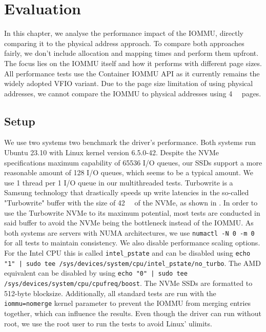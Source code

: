 \chapter{Evaluation}
In this chapter, we analyse the performance impact of the IOMMU, directly comparing it to the physical address approach. To compare both approaches fairly, we don't include allocation and mapping times and perform them upfront. The focus lies on the IOMMU itself and how it performs with different page sizes. All performance tests use the Container IOMMU API as it currently remains the widely adopted VFIO variant.
Due to the page size limitation of using physical addresses, we cannot compare the IOMMU to physical addresses using \qty{4}{\kibi\byte} pages.

\section{Setup}
We use two systems two benchmark the driver's performance.
Both systems run Ubuntu 23.10 with Linux kernel version 6.5.0-42.
Despite the NVMe specifications maximum capability of 65536 I/O queues, our SSDs support a more reasonable amount of 128 I/O queues, which seems to be a typical amount.
We use 1 thread per 1 I/O queue in our multithreaded tests. Turbowrite is a Samsung technology that drastically speeds up write latencies in the so-called "Turbowrite" buffer with the size of \qty{42}{\giga\byte} of the NVMe, as shown in \cite{vroom}. In order to use the Turbowrite NVMe to its maximum potential, most tests are conducted in said buffer to avoid the NVMe being the bottleneck instead of the IOMMU.
As both systems are servers with NUMA architectures, we use \texttt{numactl -N 0 -m 0} for all tests to maintain consistency. We also disable performance scaling options. For the Intel CPU this is called \texttt{intel\_pstate} and can be disabled using \texttt{echo "1" | sudo tee /sys/devices/system/cpu/intel\_pstate/no\_turbo}. The AMD equivalent can be disabled by using \texttt{echo "0" | sudo tee /sys/devices/system/cpu/cpufreq/boost}.
The NVMe SSDs are formatted to 512-byte blocksize.
Additionally, all standard tests are run with the \texttt{iommu=nomerge} kernel parameter to prevent the IOMMU from merging entries together, which can influence the results. Even though the driver can run without root, we use the root user to run the tests to avoid Linux' ulimits.


